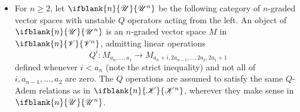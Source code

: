 \documentclass[10pt]{article}
\newcommand{\LL}[1]{\ifblank{#1}{\scrK}{\scrK^{#1}}}
\newcommand{\GR}[1]{\ifblank{#1}{\scrV}{\scrV^{#1}}}
\newcommand{\nontop}[1]{\ifblank{#1}{\scrU}{\scrU^{#1}}}
\renewcommand{\Q}{Q}
\begin{document}
\begin{CategoriesOfInterest}
\begin{itemize}

\item For $n\geq2$, let $\nontop{n}$ be the following category of $n$-graded vector spaces with unstable $\Q$ operators acting from the left. An object of $\nontop{n}$ is an $n$-graded vector space $M$ in $\GR{n}$,
admitting linear operations
\[\Q^i:M_{a_n,\ldots,a_1}\to M_{a_n+i,2a_{n-1},\ldots,2a_2,2a_1+1}\]
defined whenever $i< a_n$ (note the strict inequality) and not all of $i,a_{n-1},\ldots,a_{2}$ are zero.
The $\Q$ operations are assumed to satisfy the same $\Q$-Adem relations as in $\LL{n}$, wherever they make sense in $\nontop{n}$. %
\end{itemize}


\end{CategoriesOfInterest}
\end{document}
